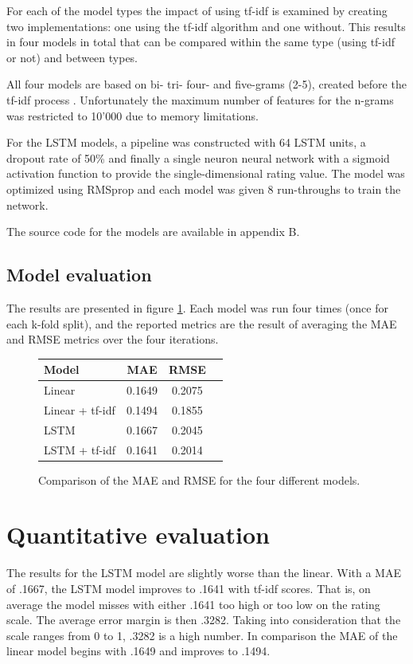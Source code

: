 \documentclass[a4paper]{article}
\begin{document}
For each of the model types the impact of using tf-idf is examined by creating
two implementations: one using the tf-idf algorithm and one without. This
results in four models in total that can be compared within the same type
(using tf-idf or not) and between types.

All four models are based on bi- tri- four- and five-grams (2-5),
created before the tf-idf process \cite{Jurafsky2000}. Unfortunately the
maximum number of features for the n-grams was restricted to 10'000 due to
memory limitations.

For the LSTM models, a pipeline was constructed with 64 LSTM units, a dropout
rate of 50\% and finally a single neuron neural network with a sigmoid
activation function to provide the single-dimensional rating value. The
model was optimized using RMSprop and each model was given 8 run-throughs to
train the network.

The source code for the models are available in appendix B.

\subsection{Model evaluation}
The results are presented in figure \ref{fig:results}.
Each model was run four times (once for each k-fold split), and
the reported metrics are the result of averaging the MAE and RMSE metrics over
the four iterations.

\begin{figure}
  \begin{centering}
    \begin{tabular}{ l c c c }
      \textbf{Model} & \textbf{MAE} & \textbf{RMSE} \\ \hline
      Linear          & 0.1649 & 0.2075 \\
      Linear + tf-idf & 0.1494 & 0.1855 \\
      LSTM            & 0.1667 & 0.2045 \\
      LSTM + tf-idf   & 0.1641 & 0.2014
    \end{tabular}
    \caption{Comparison of the MAE and RMSE for the four different models.}
    \label{fig:results}
  \end{centering}
\end{figure}

\section{Quantitative evaluation}
The results for the LSTM model are slightly worse than the linear. With a MAE
of .1667, the LSTM model improves to .1641 with tf-idf scores. That is,
on average the model misses with either .1641 too high or too low on the
rating scale. The average error margin is then .3282. Taking into consideration
that the scale ranges from 0 to 1, .3282 is a high number.
In comparison the MAE of the linear model begins with .1649 and improves to
.1494.
\end{document}
